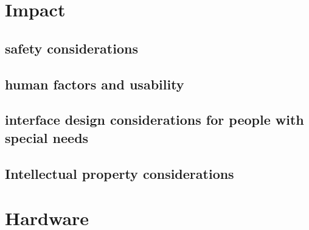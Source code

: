 \documentclass[10pt]{article}
\begin{document}
\section{Impact}
\subsection{safety considerations}
\subsection{human factors and usability}
\subsection{interface design considerations for people with special needs}
\subsection{Intellectual property considerations}

\section{Hardware}
\end{document}
